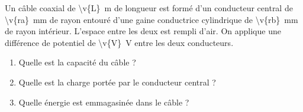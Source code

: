Un câble coaxial de \qty{\v{L}}{m} de longueur est formé d'un conducteur central de \qty{\v{ra}}{mm} de rayon entouré d'une gaine conductrice cylindrique de \qty{\v{rb}}{mm} de rayon intérieur. L'espace entre les deux est rempli d'air. On applique une différence de potentiel de \qty{\v{V}}{V} entre les deux conducteurs.

\begin{enumerate}[label=\alph*)]
    \item Quelle est la capacité du câble ?
    \item Quelle est la charge portée par le conducteur central ?
    \item Quelle énergie est emmagasinée dans le câble ?
\end{enumerate}
